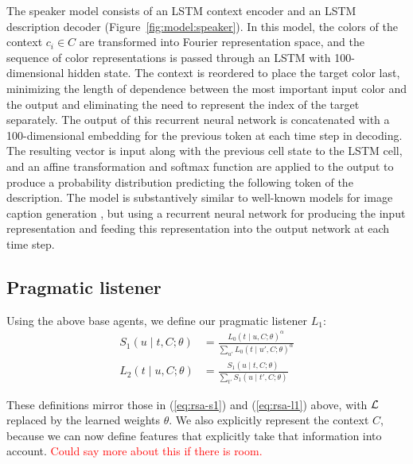 \documentclass[11pt,letterpaper]{article}
\newcommand{\eq}[1]{(\ref{#1})}
\newcommand{\Listener}{L}
\newcommand{\Speaker}{S}
\newcommand{\utt}{u}
\newcommand{\referent}{c}
\newcommand{\context}{C}
\newcommand{\target}{t}
\renewcommand{\|}{\mid}
\newcommand{\figref}[1]{Figure~\ref{#1}}
\newcommand{\todocheck}[1]{\textcolor{red}{#1}}
\begin{document}
The speaker model consists of an LSTM context encoder
and an LSTM description decoder (\figref{fig:model:speaker}). In this model, the colors of the context
$\referent_i \in \context$ are transformed into Fourier representation space,
and the sequence of color representations is passed through an LSTM with
100-dimensional hidden state. The context is reordered to place the target color
last, minimizing the length of dependence between the most important input color
and the output \cite{Sutskever2014} and eliminating the need to represent the
index of the target separately.
The output of this recurrent neural network is concatenated with a
100-dimensional embedding for the previous token at each time step in decoding.
The resulting vector is input along with the previous cell state to the LSTM cell,
and an affine transformation and softmax function are applied to the output to
produce a probability distribution predicting the following token of the description.
The model is substantively similar to well-known models for image caption generation
\cite{Karpathy2015,Vinyals2015}, but using a recurrent neural network for producing
the input representation and feeding this representation into the output network
at each time step.

\subsection{Pragmatic listener}\label{sec:l2}

Using the above base agents, we define our pragmatic listener
$\Listener_{1}$:
%
\begin{align}
\Speaker_1(\utt \| \target, \context; \theta) 
  &= \frac{\Listener_0(\target \| \utt, \context; \theta)^\alpha}{\sum_{\utt'} 
    \Listener_0(\target \| \utt', \context; \theta)^\alpha} 
    \label{eq:s1} \\
  \Listener_2(\target \| \utt, \context; \theta) 
  &= 
    \frac{
    \Speaker_1(\utt \| \target, \context; \theta)
    }{
    \sum_{\target'} \Speaker_1(\utt \| \target', \context; \theta)
    }
\end{align}

These definitions mirror those in \eq{eq:rsa-s1} and \eq{eq:rsa-l1}
above, with $\mathcal{L}$ replaced by the learned weights $\theta$. We also
explicitly represent the context $\context$, because we can now define
features that explicitly take that information into account.
\todocheck{Could say more about this if there is room.}
\end{document}
